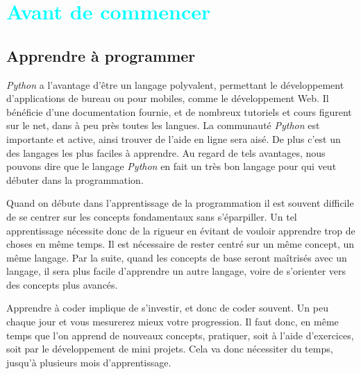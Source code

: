 \documentclass[a4paper,12pt]{book}
\title{\fbox{PYTHON de A à Y}}
\author{krystof}
\date{\today}
\begin{document}
\maketitle
\tableofcontents

\part{\textcolor{cyan}{Avant de commencer}}
\pagestyle{fancy}
\renewcommand{\headrulewidth}{1pt}
\renewcommand{\headsep}{15pt}
\setlength{\headheight}{1cm}
\lhead{\textcolor{cyan}{Chapitre \thechapter}}
\rhead{\thepage}
\cfoot{}
\chapter{Apprendre à programmer}

\textit{Python} a l'avantage d'être un langage polyvalent, permettant le développement d'applications de bureau ou pour mobiles, comme le développement Web. Il bénéficie d'une documentation fournie, et de nombreux tutoriels et cours figurent sur le net, dans à peu près toutes les langues. La communauté \textit{Python} est importante et active, ainsi trouver de l'aide en ligne sera aisé. De plus c'est un des langages les plus faciles à apprendre. Au regard de tels avantages, nous pouvons dire que le langage \textit{Python} en fait un très bon langage pour qui veut débuter dans la programmation.
\medskip

Quand on débute dans l'apprentissage de la programmation il est souvent difficile de se centrer sur les concepts fondamentaux sans s'éparpiller. Un tel apprentissage nécessite donc de la rigueur en évitant de vouloir apprendre trop de choses en même temps. Il est nécessaire de rester centré sur un même concept, un même langage. Par la suite, quand les concepts de base seront maîtrisés avec un langage, il sera plus facile d'apprendre un autre langage, voire de s'orienter vers des concepts plus avancés.
\medskip

Apprendre à coder implique de s'investir, et donc de coder souvent. Un peu chaque jour et vous mesurerez mieux votre progression. Il faut donc, en même temps que l'on apprend de nouveaux concepts, pratiquer, soit à l'aide d'exercices, soit par le développement de mini projets. Cela va donc nécessiter du temps, jusqu'à plusieurs mois d'apprentissage.
\medskip
\end{document}
